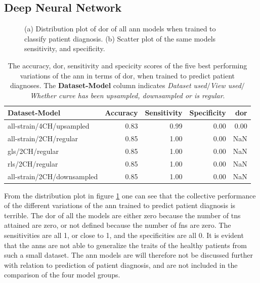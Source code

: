 \newpage

\subsection{Deep Neural Network}

\begin{figure}[H]
    \centering
    
    \caption{(a) Distribution plot of \acrshort{dor} of all \acrshort{ann} models when trained to classify patient diagnosis.
             (b) Scatter plot of the same models sensitivity, and specificity.}
    \label{fig:dl_ind_dor_sens_spec_dist}
\end{figure}

\begin{table}
    \centering
    \begin{tabular}{lrrrr}
        \toprule
        Dataset-Model              &  Accuracy &  Sensitivity &  Specificity &  \acrshort{dor} \\
        \midrule
        all-strain/4CH/upsampled   &      0.83 &         0.99 &         0.00 & 0.00 \\
        all-strain/2CH/regular     &      0.85 &         1.00 &         0.00 &  NaN \\
        gls/2CH/regular            &      0.85 &         1.00 &         0.00 &  NaN \\
        rls/2CH/regular            &      0.85 &         1.00 &         0.00 &  NaN \\
        all-strain/2CH/downsampled &      0.85 &         1.00 &         0.00 &  NaN \\
        \bottomrule
    \end{tabular}
    \caption{The accuracy, \acrshort{dor}, sensitivity and specicity scores of the five best performing variations of the \acrshort{ann} in terms of \acrshort{dor}, when trained to predict patient diagnoses.
             The \textbf{Dataset-Model} column indicates \textit{Dataset used}$/$\textit{View used}$/$\textit{Whether curve has been upsampled, downsampled or is regular}.}
    \label{tab:dl_hf_dor_sens_spec_dist}
\end{table}

From the distribution plot in figure \ref{fig:dl_ind_dor_sens_spec_dist} one can see that the collective performance of the different variations of the \acrshort{ann} trained to predict patient diagnosis
is terrible.
The \acrshort{dor} of all the models are either zero because the number of \acrshort{tn}s attained are zero, or not defined because the number of \acrshort{fn}s are zero. 
The sensitivities are all 1, or close to 1, and the specificities are all 0. 
It is evident that the \acrshort{ann}s are not able to generalize the traits of the healthy patients from such a small dataset. 
The \acrshort{ann} models are will therefore not be discussed further with relation to prediction of patient diagnosis, and are not included in the comparison of the four model groups.

